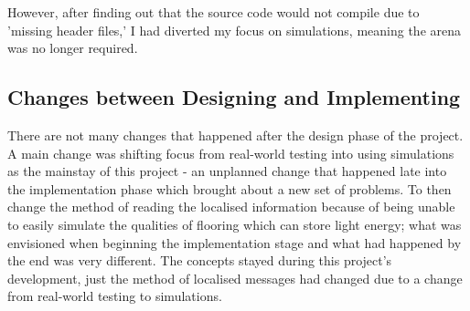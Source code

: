 However, after finding out that the source code would not compile due to
'missing header files,' I had diverted my focus on simulations, meaning the
arena was no longer required.

\subsection{Changes between Designing and Implementing}
There are not many changes that happened after the design phase of the project.
A main change was shifting focus from real-world testing into using simulations
as the mainstay of this project - an unplanned change that happened late into
the implementation phase which brought about a new set of problems.  To then
change the method of reading the localised information because of being unable
to easily simulate the qualities of flooring which can store light energy; what
was envisioned when beginning the implementation stage and what had happened
by the end was very different.  The concepts stayed during this project's
development, just the method of localised messages had changed due to a change
from real-world testing to simulations.